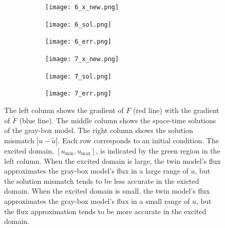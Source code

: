 \documentclass{paper1}
\begin{document}
\begin{figure}
    \begin{subfigure}[b]{.95\textwidth}
          \centering
          \begin{subfigure}[b]{0.32\textwidth}
                  \centering
                  \texttt{[image: 6\_x\_new.png]}
          \end{subfigure}%
          \begin{subfigure}[b]{0.32\textwidth}
                  \centering
                  \texttt{[image: 6\_sol.png]}
          \end{subfigure}
          \begin{subfigure}[b]{0.32\textwidth}
                  \centering
                  \texttt{[image: 6\_err.png]}
          \end{subfigure}%
    \end{subfigure}
    \begin{subfigure}[b]{.95\textwidth}
          \centering
          \begin{subfigure}[b]{0.32\textwidth}
                  \centering
                  \texttt{[image: 7\_x\_new.png]}
          \end{subfigure}%
          \begin{subfigure}[b]{0.32\textwidth}
                  \centering
                  \texttt{[image: 7\_sol.png]}
          \end{subfigure}
          \begin{subfigure}[b]{0.32\textwidth}
                  \centering
                  \texttt{[image: 7\_err.png]}
          \end{subfigure}
    \end{subfigure}

    \caption{
             \label{fig:sol compare}
             The left column shows the gradient of $F$ (red line) with the gradient of $\tilde{F}$ 
             (blue line).  The middle column shows the space-time solutions of the gray-box model.
             The right column shows the solution mismatch $\left|u-\tilde{u}\right|$. 
             Each row corresponds to an initial condition.
             The excited domain, $[u_{\min}, u_{\max}]$, is indicated by the green region in
             the left column.
             When the excited domain is large, the twin model's flux 
             approximates the gray-box model's flux in a large range of $u$, but
             the solution mismatch tends to be less accurate in the exicted domain. 
             When the excited domain is small,
             the twin model's flux approximates the gray-box model's flux in a small range of $u$, 
             but the flux approximation tends to be more accurate in the excited domain.}
\end{figure}
\end{document}
